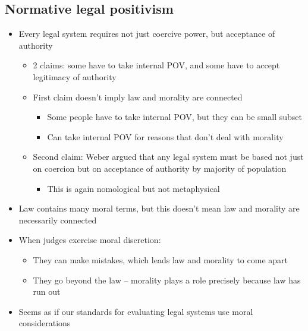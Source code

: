 \hypertarget{normative-legal-positivism}{%
\subsection{Normative legal
positivism}\label{normative-legal-positivism}}

\begin{itemize}
\tightlist
\item
  Every legal system requires not just coercive power, but acceptance of
  authority

  \begin{itemize}
  \tightlist
  \item
    2 claims: some have to take internal POV, and some have to accept
    legitimacy of authority
  \item
    First claim doesn't imply law and morality are connected

    \begin{itemize}
    \tightlist
    \item
      Some people have to take internal POV, but they can be small
      subset
    \item
      Can take internal POV for reasons that don't deal with morality
    \end{itemize}
  \item
    Second claim: Weber argued that any legal system must be based not
    just on coercion but on acceptance of authority by majority of
    population

    \begin{itemize}
    \tightlist
    \item
      This is again nomological but not metaphysical
    \end{itemize}
  \end{itemize}
\item
  Law contains many moral terms, but this doesn't mean law and morality
  are necessarily connected
\item
  When judges exercise moral discretion:

  \begin{itemize}
  \tightlist
  \item
    They can make mistakes, which leads law and morality to come apart
  \item
    They go beyond the law -- morality plays a role precisely because
    law has run out
  \end{itemize}
\item
  Seems as if our standards for evaluating legal systems use moral
  considerations


\end{itemize}
